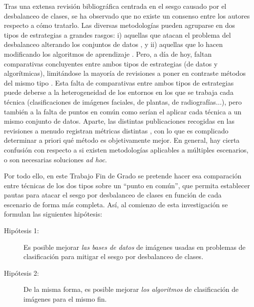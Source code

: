 Tras una extensa revisión bibliográfica centrada en el sesgo causado por el desbalanceo de clases, se ha observado que no existe un consenso entre los autores respecto a cómo tratarlo. Las diversas metodologías \cite{wadsworth2018achieving,vowels2020nestedvae,yan2019joint,hong2021fuzzy,tuncc2020fuzzy} pueden agruparse en dos tipos de estrategias a grandes rasgos: i) aquellas que atacan el problema del desbalanceo alterando los conjuntos de datos \cite{upadhyay2021state,nafi2020addressing,johnson2019survey}, y ii) aquellas que lo hacen modificando los algoritmos de aprendizaje \cite{lin2017focal,khan2017cost,narayanan2020transfer,rahimzadeh2020modified}. Pero, a día de hoy, faltan comparativas concluyentes entre ambos tipos de estrategias (de datos y algorítmicas), limitándose la mayoría de revisiones \cite{johnson2019survey,upadhyay2021state,vluymans2019dealing} a poner en contraste métodos del mismo tipo \cite{nafi2020addressing}. Esta falta de comparativas entre ambos tipos de estrategias puede deberse a la heterogeneidad de los entornos en los que se trabaja cada técnica (clasificaciones de imágenes faciales, de plantas, de radiografías...), pero también a la falta de puntos en común como serían el aplicar cada técnica a un mismo conjunto de datos. Aparte, las distintas publicaciones recogidas en las revisiones a menudo registran métricas distintas \cite{upadhyay2021state,nafi2020addressing,johnson2019survey,lin2017focal,khan2017cost,narayanan2020transfer,rahimzadeh2020modified}, con lo que es complicado determinar a priori qué método es objetivamente mejor. En general, hay cierta confusión con respecto a si existen metodologías aplicables a múltiples escenarios, o son necesarias soluciones \textit{ad hoc}.

Por todo ello, en este Trabajo Fin de Grado se pretende hacer esa comparación entre técnicas de los dos tipos sobre un ``punto en común'', que permita establecer pautas para atacar el sesgo por desbalanceo de clases en función de cada escenario de forma más completa. Así, al comienzo de esta investigación se formulan las siguientes hipótesis:

\begin{description}
    \item[Hipótesis 1:] Es posible mejorar \textit{las bases de datos} de imágenes usadas en problemas de clasificación para mitigar el sesgo por desbalanceo de clases.
    \item[Hipótesis 2:] De la misma forma, es posible mejorar \textit{los algoritmos} de clasificación de imágenes para el mismo fin.
\end{description}

